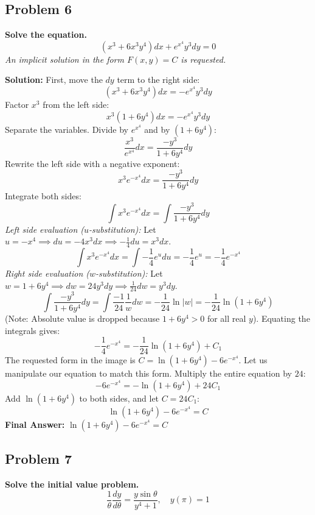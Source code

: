 \documentclass[11pt]{article}
\begin{document}
\vspace{0.5cm}
\subsection*{Problem 6}
\textbf{Solve the equation.}
\[ (x^3 + 6x^3y^4)dx + e^{x^4}y^3dy = 0 \]
\textit{An implicit solution in the form $F(x,y)=C$ is requested.}

\textbf{Solution:}
First, move the $dy$ term to the right side:
\[ (x^3 + 6x^3y^4)dx = -e^{x^4}y^3dy \]
Factor $x^3$ from the left side:
\[ x^3(1 + 6y^4)dx = -e^{x^4}y^3dy \]
Separate the variables. Divide by $e^{x^4}$ and by $(1+6y^4)$:
\[ \frac{x^3}{e^{x^4}} dx = \frac{-y^3}{1+6y^4} dy \]
Rewrite the left side with a negative exponent:
\[ x^3 e^{-x^4} dx = \frac{-y^3}{1+6y^4} dy \]
Integrate both sides:
\[ \int x^3 e^{-x^4} dx = \int \frac{-y^3}{1+6y^4} dy \]
\textit{Left side evaluation ($u$-substitution):}
Let $u = -x^4 \implies du = -4x^3 dx \implies -\frac{1}{4}du = x^3 dx$.
\[ \int x^3 e^{-x^4} dx = \int -\frac{1}{4} e^u du = -\frac{1}{4}e^u = -\frac{1}{4}e^{-x^4} \]
\textit{Right side evaluation ($w$-substitution):}
Let $w = 1+6y^4 \implies dw = 24y^3 dy \implies \frac{1}{24}dw = y^3 dy$.
\[ \int \frac{-y^3}{1+6y^4} dy = \int \frac{-1}{24} \frac{1}{w} dw = -\frac{1}{24}\ln|w| = -\frac{1}{24}\ln(1+6y^4) \]
(Note: Absolute value is dropped because $1+6y^4 > 0$ for all real $y$).
Equating the integrals gives:
\[ -\frac{1}{4}e^{-x^4} = -\frac{1}{24}\ln(1+6y^4) + C_1 \]
The requested form in the image is $C = \ln(1+6y^4) - 6e^{-x^4}$. Let us manipulate our equation to match this form. Multiply the entire equation by $24$:
\[ -6e^{-x^4} = -\ln(1+6y^4) + 24C_1 \]
Add $\ln(1+6y^4)$ to both sides, and let $C = 24C_1$:
\[ \ln(1+6y^4) - 6e^{-x^4} = C \]
\textbf{Final Answer:} \textbf{$\ln(1+6y^4) - 6e^{-x^4} = C$}

\vspace{0.5cm}
\subsection*{Problem 7}
\textbf{Solve the initial value problem.}
\[ \frac{1}{\theta} \frac{dy}{d\theta} = \frac{y \sin\theta}{y^4+1}, \quad y(\pi) = 1 \]
\end{document}
